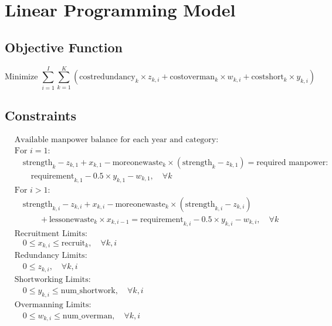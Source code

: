 \documentclass{article}
\begin{document}
\section*{Linear Programming Model}

\subsection*{Objective Function}
\[
\text{Minimize } \sum_{i=1}^{I} \sum_{k=1}^{K} \left( \text{costredundancy}_{k} \times z_{k,i} + \text{costoverman}_{k} \times w_{k,i} + \text{costshort}_{k} \times y_{k,i} \right)
\]

\subsection*{Constraints}
\begin{align*}
&\text{Available manpower balance for each year and category:} \\
&\text{For } i = 1: \\
& \quad \text{strength}_k - z_{k,1} + x_{k,1} - \text{moreonewaste}_{k} \times ( \text{strength}_k - z_{k,1} ) = \text{required manpower: } \\
& \quad \quad \text{requirement}_{k,1} - 0.5 \times y_{k,1} - w_{k,1}, \quad \forall k \\
&\text{For } i > 1: \\
& \quad \text{strength}_{k,i} - z_{k,i} + x_{k,i} - \text{moreonewaste}_{k} \times ( \text{strength}_{k,i} - z_{k,i} ) \\
& \quad \quad \quad + \text{lessonewaste}_{k} \times x_{k,i-1} = \text{requirement}_{k,i} - 0.5 \times y_{k,i} - w_{k,i}, \quad \forall k \\
&\text{Recruitment Limits:} \\
& \quad 0 \leq x_{k,i} \leq \text{recruit}_k, \quad \forall k, i \\
& \text{Redundancy Limits:} \\
& \quad 0 \leq z_{k,i}, \quad \forall k, i \\
& \text{Shortworking Limits:} \\
& \quad 0 \leq y_{k,i} \leq \text{num\_shortwork}, \quad \forall k, i \\
& \text{Overmanning Limits:} \\
& \quad 0 \leq w_{k,i} \leq \text{num\_overman}, \quad \forall k, i \\
\end{align*}
\end{document}
